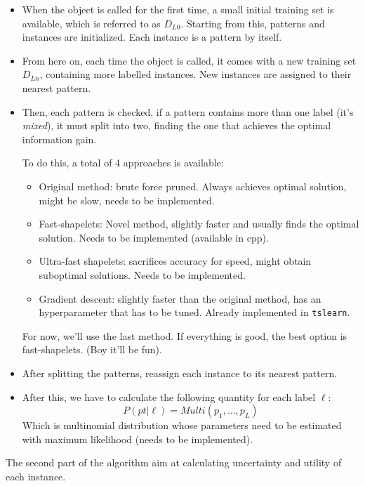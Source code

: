 \begin{itemize}
    \item When the object is called for the first time, a small initial training set
    is available, which is referred to as $D_{L0}$. Starting from this, patterns and 
    instances are initialized. Each instance is a pattern by itself.
    \item From here on, each time the object is called, it comes with a new training
    set $D_{Ln}$, containing more labelled instances. New instances are assigned to 
    their nearest pattern.
    \item Then, each pattern is checked, if a pattern contains more than one label 
    (it's \textit{mixed}), it must split into two, finding the one that achieves 
    the optimal information gain. 

    To do this, a total of 4 approaches is available:
    \begin{itemize}
        \item Original method: brute force pruned. Always achieves optimal solution, might be slow, 
        needs to be implemented.
        \item Fast-shapelets: Novel method, slightly faster and usually finds the optimal solution.
        Needs to be implemented (available in cpp). 
        \item Ultra-fast shapelets: sacrifices accuracy for speed, might obtain suboptimal solutions. 
        Needs to be implemented.
        \item Gradient descent: slightly faster than the original method, has an hyperparameter that has
        to be tuned. Already implemented in \texttt{tslearn}. 
    \end{itemize}
    For now, we'll use the last method. If everything is good, the best option is fast-shapelets. (Boy it'll be fun).
    \item After splitting the patterns, reassign each instance to its nearest pattern.
    \item After this, we have to calculate the following quantity for each label $\ell$:
    \begin{equation}
        P(pt | \ell) = Multi(p_1, \dots, p_L)
    \end{equation}
    Which is multinomial distribution whose parameters need to be estimated with maximum likelihood 
    (needs to be implemented).
\end{itemize}

The second part of the algorithm aim at calculating uncertainty and utility of each instance.

